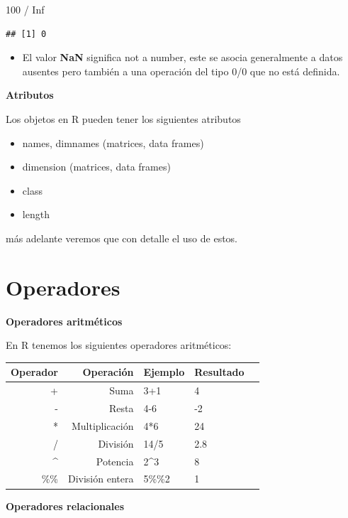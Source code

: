 \documentclass[
  12pt,
]{book}
\newenvironment{Shaded}{\begin{snugshade}}{\end{snugshade}}
\newcommand{\ConstantTok}[1]{\textcolor[rgb]{0.00,0.00,0.00}{#1}}
\newcommand{\DecValTok}[1]{\textcolor[rgb]{0.00,0.00,0.81}{#1}}
\newcommand{\SpecialCharTok}[1]{\textcolor[rgb]{0.00,0.00,0.00}{#1}}
\providecommand{\tightlist}{%
  \setlength{\itemsep}{0pt}\setlength{\parskip}{0pt}}
\begin{document}
\begin{Shaded}
\begin{Highlighting}[]
\DecValTok{100} \SpecialCharTok{/} \ConstantTok{Inf}
\end{Highlighting}
\end{Shaded}

\begin{verbatim}
## [1] 0
\end{verbatim}

\begin{itemize}
\tightlist
\item
  El valor \textbf{NaN} significa not a number, este se asocia generalmente a datos ausentes pero también a una operación del tipo 0/0 que no está definida.
\end{itemize}

\textbf{Atributos}

Los objetos en R pueden tener los siguientes atributos

\begin{itemize}
\tightlist
\item
  names, dimnames (matrices, data frames)
\item
  dimension (matrices, data frames)
\item
  class
\item
  length
\end{itemize}

más adelante veremos que con detalle el uso de estos.

\hypertarget{operadores}{%
\chapter{\texorpdfstring{\textbf{Operadores}}{Operadores}}\label{operadores}}

\textbf{Operadores aritméticos}

En R tenemos los siguientes operadores aritméticos:

\begin{longtable}[]{@{}rrlll@{}}
\toprule
Operador & Operación & Ejemplo & Resultado &\tabularnewline
\midrule
\endhead
+ & Suma & 3+1 & 4 &\tabularnewline
- & Resta & 4-6 & -2 &\tabularnewline
* & Multiplicación & 4*6 & 24 &\tabularnewline
/ & División & 14/5 & 2.8 &\tabularnewline
\^{} & Potencia & 2\^{}3 & 8 &\tabularnewline
\%\% & División entera & 5\%\%2 & 1 &\tabularnewline
\bottomrule
\end{longtable}

\textbf{Operadores relacionales}
\end{document}
